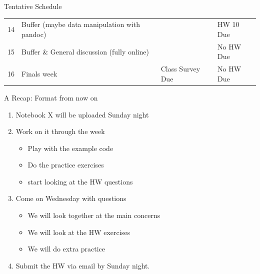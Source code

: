 \documentclass[professionalfonts, xcolor={usenames,svgnames,x11names,table}]{beamer}
\begin{document}
\begin{frame}{Tentative Schedule}
\begin{table}[]
{\begin{tabular}{llll}
14                       & Buffer  (maybe data manipulation with pandoc) &                               & HW 10 Due                     \\
15                       & Buffer   \& General discussion (fully online) &                               & No HW Due                     \\
16                       & Finals week                                   & Class Survey Due              & No HW Due                    
\end{tabular}}
\end{table}
\end{frame}

\begin{frame}{A Recap: Format  from now on}
    \begin{enumerate}
        \item Notebook X will be uploaded Sunday night
        \item Work on it through the week
        \begin{itemize}
        \item Play with the example code
        \item Do the practice exercises
        \item start looking at the HW questions
        \end{itemize}
        \item Come on Wednesday with questions
        \begin{itemize}
        \item We will look together at the main concerns
        \item We will look at the HW exercises
        \item We will do extra practice
        \end{itemize}
        \item Submit the HW via email by Sunday night.
         \end{enumerate}
\end{frame}


%
\end{document}
